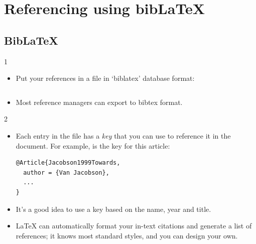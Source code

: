 \documentclass[10pt,times]{beamer}
\begin{document}
\section{Referencing using bib\LaTeX}
\subsection{Bib\LaTeX}
\begin{frame}[fragile]{\insertsubsection{} 1}
\begin{itemize}
\item Put your references in a  file in `biblatex' database format:
\inputminted[fontsize=\scriptsize,frame=single]{latex}{references.bib}
\item Most reference managers can export to bibtex format.
\end{itemize}
\end{frame}


\begin{frame}[fragile]{\insertsubsection{} 2}
\begin{itemize}
\item Each entry in the  file has a \emph{key} that you can use to
reference it in the document. For example,  is the 
key for this article:
\begin{verbatim}
@Article{Jacobson1999Towards,
  author = {Van Jacobson},
  ...
}
\end{verbatim}
\item It's a good idea to use a key based on the name, year and title.
\item \LaTeX{} can automatically format your in-text citations and generate a
list of references; it knows most standard styles, and you can design your own.
\end{itemize}
\end{frame}
\end{document}

